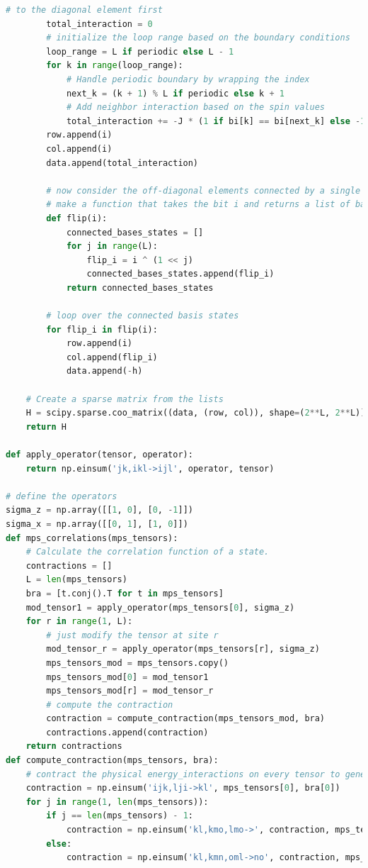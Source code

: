 \documentclass[12pt]{article}
\begin{document}
\begin{lstlisting}[language=Python]
        # to the diagonal element first
        total_interaction = 0
        # initialize the loop range based on the boundary conditions
        loop_range = L if periodic else L - 1
        for k in range(loop_range):
            # Handle periodic boundary by wrapping the index
            next_k = (k + 1) % L if periodic else k + 1
            # Add neighbor interaction based on the spin values
            total_interaction += -J * (1 if bi[k] == bi[next_k] else -1)
        row.append(i)
        col.append(i)
        data.append(total_interaction)

        # now consider the off-diagonal elements connected by a single spin flip
        # make a function that takes the bit i and returns a list of basis states connected by a single flip
        def flip(i):
            connected_bases_states = []
            for j in range(L):
                flip_i = i ^ (1 << j)
                connected_bases_states.append(flip_i)
            return connected_bases_states
        
        # loop over the connected basis states
        for flip_i in flip(i):
            row.append(i)
            col.append(flip_i)
            data.append(-h)       

    # Create a sparse matrix from the lists
    H = scipy.sparse.coo_matrix((data, (row, col)), shape=(2**L, 2**L))
    return H

def apply_operator(tensor, operator):
    return np.einsum('jk,ikl->ijl', operator, tensor)

# define the operators
sigma_z = np.array([[1, 0], [0, -1]])
sigma_x = np.array([[0, 1], [1, 0]])
def mps_correlations(mps_tensors):
    # Calculate the correlation function of a state.
    contractions = []
    L = len(mps_tensors)
    bra = [t.conj().T for t in mps_tensors]
    mod_tensor1 = apply_operator(mps_tensors[0], sigma_z)
    for r in range(1, L):
        # just modify the tensor at site r
        mod_tensor_r = apply_operator(mps_tensors[r], sigma_z)
        mps_tensors_mod = mps_tensors.copy()
        mps_tensors_mod[0] = mod_tensor1
        mps_tensors_mod[r] = mod_tensor_r
        # compute the contraction
        contraction = compute_contraction(mps_tensors_mod, bra)
        contractions.append(contraction)
    return contractions
def compute_contraction(mps_tensors, bra):
    # contract the physical energy_interactions on every tensor to generate a list of 2-tensors
    contraction = np.einsum('ijk,lji->kl', mps_tensors[0], bra[0])
    for j in range(1, len(mps_tensors)):
        if j == len(mps_tensors) - 1:
            contraction = np.einsum('kl,kmo,lmo->', contraction, mps_tensors[j], bra[j])
        else:
            contraction = np.einsum('kl,kmn,oml->no', contraction, mps_tensors[j], bra[j])
            

\end{lstlisting}
\end{document}
